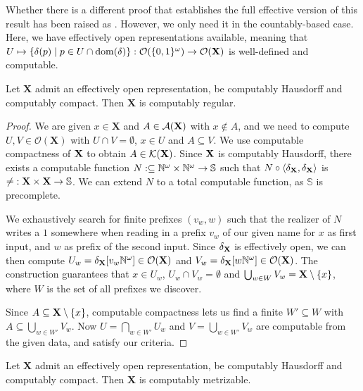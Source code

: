 \documentclass{eptcs-modified}
\begin{document}
Whether there is a different proof that establishes the full effective version of this result has been raised as \cite[Question 9]{oberwolfach-computability}. However, we only need it in the countably-based case. Here, we have effectively open representations available, meaning that $U \mapsto \{\delta(p) \mid p \in U \cap \operatorname{dom}(\delta)\} : \mathcal{O}({\{0,1\}^\omega}) \to \mathcal{O}(\mathbf{X})$ is well-defined and computable.

\begin{theorem}\label{theorem:coregular}
Let $\mathbf{X}$ admit an effectively open representation, be computably Hausdorff and computably compact. Then $\mathbf{X}$ is computably regular.
\begin{proof}
We are given $x \in \mathbf{X}$ and $A \in \mathcal{A}(\mathbf{X})$ with $x \notin A$, and we need to compute $U, V \in \mathcal{O}(\mathbf{X})$ with $U \cap V = \emptyset$, $x \in U$ and $A \subseteq V$. We use computable compactness of $\mathbf{X}$ to obtain $A \in \mathcal{K}(\mathbf{X})$. Since $\mathbf{X}$ is computably Hausdorff, there exists a computable function $N : \subseteq {\mathbb{N}^\omega} \times {\mathbb{N}^\omega} \to \mathbb{S}$ such that $N \circ \langle \delta_{\mathbf{X}}, \delta_{\mathbf{X}}\rangle$ is $\mathalpha{\neq} : \X \times \X \to \mathbb{S}$. We can extend $N$ to a total computable function, as $\mathbb{S}$ is precomplete.

We exhaustively search for finite prefixes $(v_w,w)$ such that the realizer of $N$ writes a $1$ somewhere when reading in a prefix $v_w$ of our given name for $x$ as first input, and $w$ as prefix of the second input. Since $\delta_{\mathbf{X}}$ is effectively open, we can then compute $U_w = \delta_{\mathbf{X}}[v_w{\mathbb{N}^\omega}] \in \mathcal{O}(\mathbf{X})$ and $V_w = \delta_{\mathbf{X}}[w{\mathbb{N}^\omega}] \in \mathcal{O}(\mathbf{X})$. The construction guarantees that $x \in U_w$, $U_w \cap V_w = \emptyset$ and $\bigcup_{w \in W} V_w = \mathbf{X} \setminus \{x\}$, where $W$ is the set of all prefixes we discover.

Since $A \subseteq \mathbf{X} \setminus \{x\}$, computable compactness lets us find a finite $W' \subseteq W$ with $A \subseteq \bigcup_{w \in W'} V_w$. Now $U = \bigcap_{w \in W'} U_w$ and $V = \bigcup_{w \in W'} V_w$ are computable from the given data, and satisfy our criteria.
\end{proof}
\end{theorem}

\begin{corollary}
Let $\mathbf{X}$ admit an effectively open representation, be computably Hausdorff and computably compact. Then $\mathbf{X}$ is computably metrizable.
\end{corollary}
\end{document}
